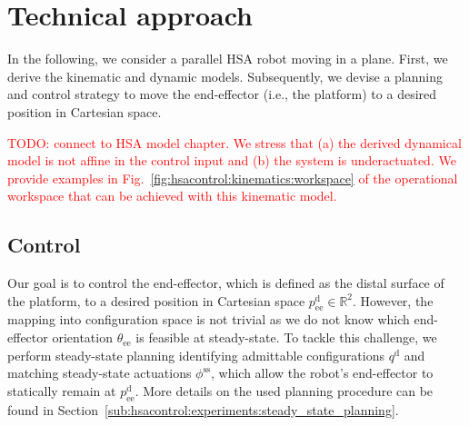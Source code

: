 \section{Technical approach}
In the following, we consider a parallel HSA robot moving in a plane. 
First, we derive the kinematic and dynamic models. Subsequently, we devise a planning and control strategy to move the end-effector (i.e., the platform) to a desired position in Cartesian space.

\textcolor{red}{
    TODO: connect to HSA model chapter.
    We stress that (a) the derived dynamical model is not affine in the control input and (b) the system is underactuated.
    We provide examples in Fig.~\ref{fig:hsacontrol:kinematics:workspace} of the operational workspace that can be achieved with this kinematic model.
}

\subsection{Control}\label{sub:hsacontrol:methodology:control}
Our goal is to control the end-effector, which is defined as the distal surface of the platform, to a desired position in Cartesian space $p_\mathrm{ee}^\mathrm{d} \in \mathbb{R}^2$. 
However, the mapping into configuration space is not trivial as we do not know which end-effector orientation $\theta_\mathrm{ee}$ is feasible at steady-state. 
To tackle this challenge, we perform steady-state planning identifying admittable configurations $q^\mathrm{d}$ and matching steady-state actuations $\phi^\mathrm{ss}$, which allow the robot's end-effector to statically remain at $p_\mathrm{ee}^\mathrm{d}$. More details on the used planning procedure can be found in Section~\ref{sub:hsacontrol:experiments:steady_state_planning}.

